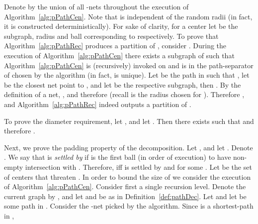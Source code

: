 \documentclass[11pt,fleqn]{article}
\begin{document}
\vspace{1pc}
Denote by  the union of all -nets throughout the execution of Algorithm~\ref{alg:pPathCen}. Note that  is independent of the random radii (in fact, it is constructed deterministically). For sake of clarity, for a center  let  be the subgraph, radius and ball corresponding to  respectively.
To prove that Algorithm~\ref{alg:pPathRec} produces a partition of , consider . During the execution of Algorithm~\ref{alg:pPathCen} there exists a subgraph  of  such that Algorithm~\ref{alg:pPathCen} is (recursively) invoked on  and  is in the path-separator  of  chosen by the algorithm (in fact,  is unique). 
Let  be the path in  such that , let  be the closest net point to , and let  be the respective subgraph, then . By the definition of a net, , and therefore  (recall  is the radius chosen for ). Therefore , and Algorithm~\ref{alg:pPathRec} indeed outputs a partition of .

To prove the diameter requirement, let , and let . Then there exists  such that  and therefore .

Next, we prove the padding property of the decomposition. 
Let , and let . Denote .
We say that  is {\em settled by } if  is the first ball (in order of execution) to have non-empty intersection with . Therefore,  iff  is settled by  and  for some .
Let  be the set of centers that threaten . In order to bound the size of  we consider the execution of Algorithm~\ref{alg:pPathCen}.
Consider first a single recursion level. Denote the current graph by , and let  and  be as in Definition~\ref{def:pathDec}. Let  and let  be some path in .  Consider the -net  picked by the algorithm. Since  is a shortest-path in , 
\end{document}
